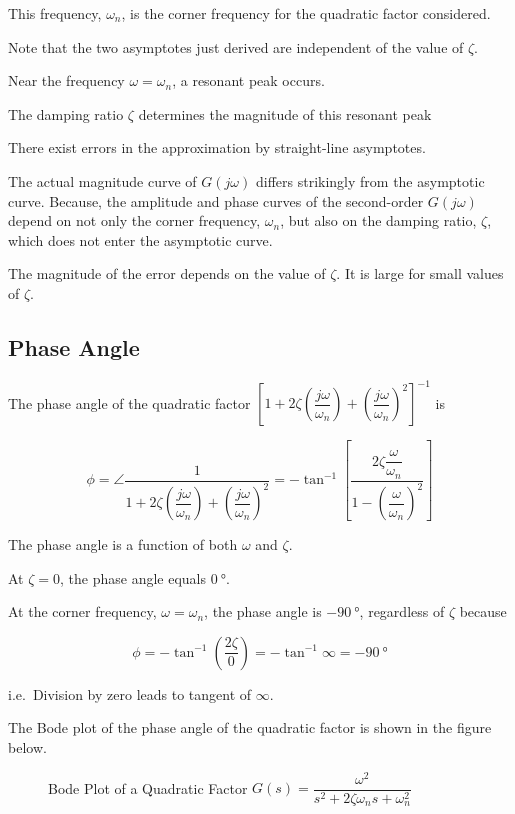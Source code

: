 \documentclass[
  14pt,
  a4paper,
  oneside,
  open=any,
  a4paper,
  14pt]{report}
\begin{document}
This frequency, \(\omega_n\), is the corner frequency for the quadratic
factor considered.

Note that the two asymptotes just derived are independent of the value
of \(\zeta\).

Near the frequency \(\omega = \omega_n\), a resonant peak occurs.

The damping ratio \(\zeta\) determines the magnitude of this resonant
peak

There exist errors in the approximation by straight-line asymptotes.

The actual magnitude curve of \(G(j\omega)\) differs strikingly from the
asymptotic curve. Because, the amplitude and phase curves of the
second-order \(G(j\omega)\) depend on not only the corner frequency,
\(\omega_n\), but also on the damping ratio, \(\zeta\), which does not
enter the asymptotic curve.

The magnitude of the error depends on the value of \(\zeta\). It is
large for small values of \(\zeta\).

\subsection{Phase Angle}\label{phase-angle-2}

The phase angle of the quadratic factor
\(\left[1+2\zeta\left(\dfrac{j\omega}{\omega_n}\right) + \left(\dfrac{j\omega}{\omega_n}\right)^2\right]^{-1}\)
is

\[
    \phi = \angle\dfrac{1}{1+2\zeta\left(\dfrac{j\omega}{\omega_n}\right) + \left(\dfrac{j\omega}{\omega_n}\right)^2} = -\tan^{-1}\left[\dfrac{2\zeta \dfrac{\omega}{\omega_n}}{1-\left(\dfrac{\omega}{\omega_n}\right)^2}\right]
\]

The phase angle is a function of both \(\omega\) and \(\zeta\).

At \(\zeta = 0\), the phase angle equals \(\SI{0}{\degree}\).

At the corner frequency, \(\omega = \omega_n\), the phase angle is
\(\SI{-90}{\degree}\), regardless of \(\zeta\) because

\[
    \phi = -\tan^{-1} \left(\dfrac{2\zeta}{0}\right) = -\tan^{-1} \infty = \SI{-90}{\degree}
\]

i.e.~Division by zero leads to tangent of \(\infty\).

The Bode plot of the phase angle of the quadratic factor is shown in the
figure below.

\begin{figure}

\centering{



}

\caption{\label{fig-bode-plot-quadratic-factor}Bode Plot of a Quadratic
Factor \(G(s) = \dfrac{\omega^2}{s^2+2\zeta\omega_n s + \omega_n^2}\)}

\end{figure}%
\end{document}
